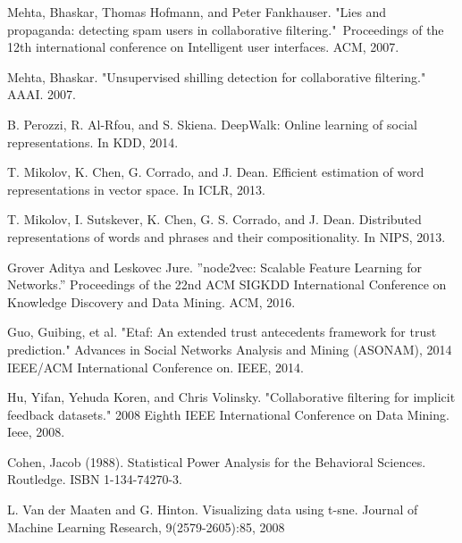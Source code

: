 \documentclass[master,english,final]{kaist-ucs}
\begin{document}
\begin{thebibliography}{00}
 Mehta, Bhaskar, Thomas Hofmann, and Peter Fankhauser. "Lies and propaganda: detecting spam users in collaborative filtering." Proceedings of the 12th international conference on Intelligent user interfaces. ACM, 2007.


 Mehta, Bhaskar. "Unsupervised shilling detection for collaborative filtering." AAAI. 2007.

 B. Perozzi, R. Al-Rfou, and S. Skiena. DeepWalk: Online learning of social representations. In KDD, 2014.

 T. Mikolov, K. Chen, G. Corrado, and J. Dean. Efficient estimation of word representations in vector space. In ICLR, 2013.

 T. Mikolov, I. Sutskever, K. Chen, G. S. Corrado, and J. Dean. Distributed representations of words and phrases and their compositionality. In NIPS, 2013.

 Grover Aditya and  Leskovec Jure. ”node2vec: Scalable Feature Learning for Networks.” Proceedings of the 22nd ACM SIGKDD International Conference on Knowledge Discovery and Data Mining. ACM, 2016.

 Guo, Guibing, et al. "Etaf: An extended trust antecedents framework for trust prediction." Advances in Social Networks Analysis and Mining (ASONAM), 2014 IEEE/ACM International Conference on. IEEE, 2014.

 Hu, Yifan, Yehuda Koren, and Chris Volinsky. "Collaborative filtering for implicit feedback datasets." 2008 Eighth IEEE International Conference on Data Mining. Ieee, 2008.

  Cohen, Jacob (1988). Statistical Power Analysis for the Behavioral Sciences. Routledge. ISBN 1-134-74270-3.

 L. Van der Maaten and G. Hinton. Visualizing data using t-sne. Journal of Machine Learning Research, 9(2579-2605):85, 2008

\end{thebibliography}





\end{document}
